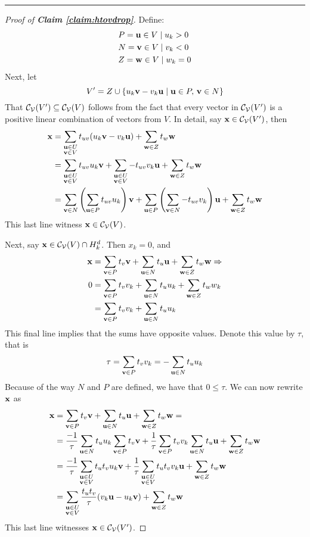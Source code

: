 \documentclass[a4,fleqn]{article}
\begin{document}
\bigskip \hrule \bigskip
\begin{proof}[Proof of \textnormal{\textbf{Claim \ref{claim:htovdrop}}}]
Define:
\begin{align*}
  &P = \mathbf{u} \in V \;|\; u_k > 0 \\
  &N = \mathbf{v} \in V \;|\; v_k < 0 \\
  &Z = \mathbf{w} \in V \;|\; w_k = 0
\end{align*}
Next, let
\[ V' = Z \cup \left\{u_k \mathbf{v} - v_k \mathbf{u} \;|\; \mathbf{u} \in P,\, \mathbf{v} \in N\right\} \]
That $\mathcal{C}_{\mathcal{V}}(V') \subseteq \mathcal{C}_{\mathcal{V}}(V)$ follows from the fact that every vector in $\mathcal{C}_{\mathcal{V}}(V')$ is a positive linear combination of vectors from $V$.  In detail, say $\mathbf{x} \in \mathcal{C}_{\mathcal{V}}(V')$, then
\begin{align*}
\mathbf{x} &= \sum_{\substack{ \mathbf{u} \in U \\ \mathbf{v} \in V }} t_{uv}(u_k\mathbf{v} -v_k\mathbf{u}) + \sum_{\mathbf{w}\in Z} t_w\mathbf{w}  \\
   &= \sum_{\substack{ \mathbf{u} \in U \\ \mathbf{v} \in V }} t_{uv}u_k\mathbf{v} + \sum_{\substack{ \mathbf{u} \in U \\ \mathbf{v} \in V }} -t_{uv}v_k\mathbf{u} + \sum_{\mathbf{w}\in Z} t_w\mathbf{w}  \\
   &= \sum_{\mathbf{v}\in N}\left(\sum_{\mathbf{u}\in P} t_{uv}u_k\right)\mathbf{v} +
      \sum_{\mathbf{u}\in P}\left(\sum_{\mathbf{v}\in N} -t_{uv}v_k\right)\mathbf{u} +
      \sum_{\mathbf{w}\in Z} t_w\mathbf{w}
\end{align*}
This last line witness $\mathbf{x} \in \mathcal{C}_{\mathcal{V}}(V)$.

Next, say $\mathbf{x} \in \mathcal{C}_{\mathcal{V}}(V) \cap H^d_k$.  Then $x_k = 0$, and
\begin{align*}
\mathbf{x} &= \sum_{\mathbf{v}\in P}t_v\mathbf{v} + \sum_{\mathbf{u}\in N} t_u\mathbf{u} + \sum_{\mathbf{w}\in Z} t_w\mathbf{w} \Rightarrow \\
 0 &= \sum_{\mathbf{v}\in P}t_v v_k + \sum_{\mathbf{u}\in N} t_u u_k + \sum_{\mathbf{w}\in Z} t_w w_k \\
   &= \sum_{\mathbf{v}\in P}t_v v_k + \sum_{\mathbf{u}\in N} t_u u_k
\end{align*}
This final line implies that the sums have opposite values.  Denote this value by $\tau$, that is
\[ \tau = \sum_{\mathbf{v}\in P}t_v v_k = -\sum_{\mathbf{u}\in N} t_u u_k \]
Because of the way $N$ and $P$ are defined, we have that $0 \leq \tau$.  We can now rewrite $\mathbf{x}$ as
\begin{align*}
\mathbf{x} &= \sum_{\mathbf{v}\in P}t_v\mathbf{v} + \sum_{\mathbf{u}\in N} t_u\mathbf{u} + \sum_{\mathbf{w}\in Z} t_w\mathbf{w} = \\
   &=   \frac{-1}{\tau}\sum_{\mathbf{u}\in N}t_u u_k \sum_{\mathbf{v}\in P}t_v \mathbf{v} + 
        \frac{1}{\tau}\sum_{\mathbf{v}\in P}t_v v_k\sum_{\mathbf{u}\in N} t_u \mathbf{u} + 
        \sum_{\mathbf{w}\in Z} t_w \mathbf{w} \\
   &=   \frac{-1}{\tau}\sum_{\substack{ \mathbf{u} \in U \\ \mathbf{v} \in V }} t_u t_v u_k \mathbf{v} + 
        \frac{1}{\tau}\sum_{\substack{ \mathbf{u} \in U \\ \mathbf{v} \in V }} t_u t_v v_k \mathbf{u} + 
        \sum_{\mathbf{w}\in Z} t_w \mathbf{w} \\
   &=  \sum_{\substack{ \mathbf{u} \in U \\ \mathbf{v} \in V }} \frac{t_u t_v}{\tau}(v_k\mathbf{u} - u_k\mathbf{v}) +
        \sum_{\mathbf{w}\in Z} t_w \mathbf{w}
\end{align*}
This last line witnesses $\mathbf{x} \in \mathcal{C}_{\mathcal{V}}(V')$.
\end{proof}
\end{document}
